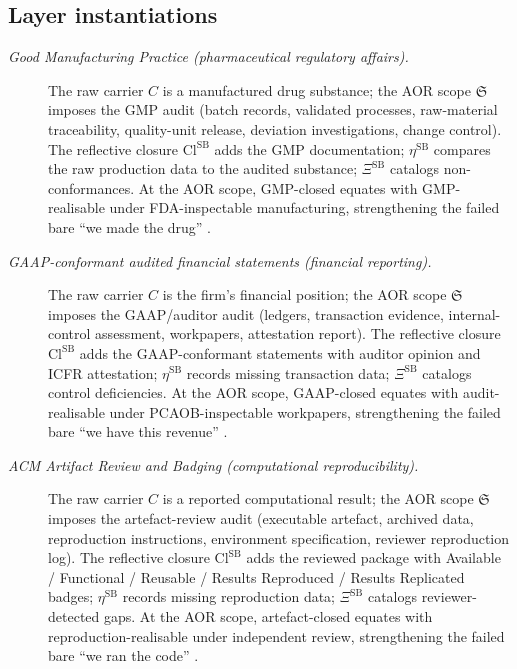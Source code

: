 \documentclass[11pt]{article}
\theoremstyle{definition}
\begin{document}
\subsection*{Layer instantiations}\label{layer-inst:F53}

\begin{description}
\item[\emph{Good Manufacturing Practice
(pharmaceutical regulatory affairs).}]
The raw carrier \(C\) is a manufactured drug
substance; the AOR scope \(\mathfrak S\) imposes
the GMP audit (batch records, validated processes,
raw-material traceability, quality-unit release,
deviation investigations, change control).  The
reflective closure \(\mathrm{Cl}^{\mathrm{SB}}\)
adds the GMP documentation; \(\eta^{\mathrm{SB}}\)
compares the raw production data to the audited
substance; \(\Xi^{\mathrm{SB}}\) catalogs
non-conformances.  At the AOR scope, GMP-closed
equates with GMP-realisable under FDA-inspectable
manufacturing, strengthening the failed bare
``we made the drug'' \citep{ICH2016Q7}.

\item[\emph{{GAAP}-conformant audited financial
statements (financial reporting).}]
The raw carrier \(C\) is the firm's financial
position; the AOR scope \(\mathfrak S\) imposes
the GAAP/auditor audit (ledgers, transaction
evidence, internal-control assessment, workpapers,
attestation report).  The reflective closure
\(\mathrm{Cl}^{\mathrm{SB}}\) adds the
GAAP-conformant statements with auditor opinion
and ICFR attestation; \(\eta^{\mathrm{SB}}\)
records missing transaction data;
\(\Xi^{\mathrm{SB}}\) catalogs control
deficiencies.  At the AOR scope, GAAP-closed
equates with audit-realisable under
PCAOB-inspectable workpapers, strengthening the
failed bare ``we have this revenue''
\citep{FASB2009ASC}.

\item[\emph{{ACM} Artifact Review and Badging
(computational reproducibility).}]
The raw carrier \(C\) is a reported computational
result; the AOR scope \(\mathfrak S\) imposes the
artefact-review audit (executable artefact,
archived data, reproduction instructions,
environment specification, reviewer reproduction
log).  The reflective closure \(\mathrm{Cl}
^{\mathrm{SB}}\) adds the reviewed package with
Available / Functional / Reusable / Results
Reproduced / Results Replicated badges;
\(\eta^{\mathrm{SB}}\) records missing reproduction
data; \(\Xi^{\mathrm{SB}}\) catalogs
reviewer-detected gaps.  At the AOR scope,
artefact-closed
equates with reproduction-realisable under
independent review, strengthening the failed bare
``we ran the code'' \citep{ACM2020Artifact}.


\end{description}
\end{document}
